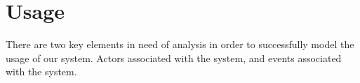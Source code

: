 \section{Usage}

There are two key elements in need of analysis in order to successfully model the usage of our system. Actors associated with the system, and events associated with the system.







